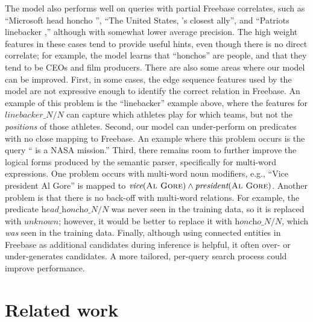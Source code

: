 \documentclass[11pt,letterpaper]{article}
\newcommand{\blank}{\underline{\hspace{.5cm}}}
\newcommand{\lexicalpredicate}[1]{\ensuremath{\textit{#1}}}
\newcommand{\entity}[1]{\ensuremath{\textsc{#1}}}
\begin{document}
The model also performs well on queries with partial Freebase correlates, such as ``Microsoft head
honcho \blank{}'', ``The United States, \blank{}'s closest ally'', and ``Patriots linebacker
\blank{},'' although with somewhat lower average precision. The high weight features in these cases
tend to provide useful hints, even though there is no direct correlate; for example, the model
learns that ``honchos'' are people, and that they tend to be CEOs and film producers.  There are also some areas where our model can be improved. First, in some cases, the edge sequence
features used by the model are not expressive enough to identify the correct relation in Freebase.
An example of this problem is the ``linebacker'' example above, where the features for
\lexicalpredicate{linebacker\_N/N} can capture which athletes play for which teams, but not the
\emph{positions} of those athletes. Second, our model can under-perform on predicates with no close
mapping to Freebase. An example where this problem occurs is the query ``\blank{} is a NASA
mission.'' Third, there remains room to further improve the logical forms produced by the semantic
parser, specifically for multi-word expressions. One problem occurs with multi-word noun modifiers,
e.g., ``Vice president Al Gore'' is mapped to $\lexicalpredicate{vice}(\entity{Al Gore}) \land
\lexicalpredicate{president}(\entity{Al Gore})$. Another problem is that there is no back-off with
multi-word relations. For example, the predicate \lexicalpredicate{head\_honcho\_N/N} was never
seen in the training data, so it is replaced with \lexicalpredicate{unknown}; however, it would be
better to replace it with \lexicalpredicate{honcho\_N/N}, which \emph{was} seen in the training
data. Finally, although using connected entities in Freebase as additional candidates during
inference is helpful, it often over- or under-generates candidates. A more tailored, per-query
search process could improve performance.

\vspace{-3.23mm}
\section{Related work}
\end{document}
